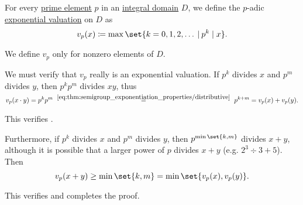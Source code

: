 \begin{definition}\label{def:padic_valuation}
  For every \hyperref[def:domain_divisibility/prime]{prime element} \( p \) in an \hyperref[def:integral_domain]{integral domain} \( D \), we define the \( p \)-adic \hyperref[def:exponential_valuation]{exponential valuation} on \( D \) as
  \begin{equation}\label{eq:def:padic_valuation}
    v_p(x) \coloneqq \max\set{ k = 0, 1, 2, \ldots \given p^k \mid x }.
  \end{equation}
\end{definition}
\begin{comments}
  \item We define \( v_p \) only for nonzero elements of \( D \).
\end{comments}
\begin{defproof}
  We must verify that \( v_p \) really is an exponential valuation. If \( p^k \) divides \( x \) and \( p^m \) divides \( y \), then \( p^k p^m \) divides \( xy \), thus
  \begin{equation*}
    v_p(x \cdot y)
    =
    p^k p^m
    \reloset {\eqref{eq:thm:semigroup_exponentiation_properties/distributive}} =
    p^{k + m}
    =
    v_p(x) + v_p(y).
  \end{equation*}

  This verifies .

  Furthermore, if \( p^k \) divides \( x \) and \( p^m \) divides \( y \), then \( p^{\min\set{ k, m }} \) divides \( x + y \), although it is possible that a larger power of \( p \) divides \( x + y \) (e.g. \( 2^3 \div 3 + 5 \)). Then
  \begin{equation*}
    v_p(x + y)
    \geq
    \min\set{ k, m }
    =
    \min\set{ v_p(x), v_p(y) }.
  \end{equation*}

  This verifies  and completes the proof.
\end{defproof}

